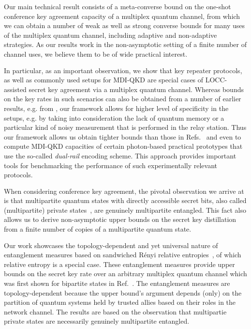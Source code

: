 \documentclass[aps,pra,twocolumn,superscriptaddress,longbibliography]{revtex4-1}
\begin{document}
Our main technical result consists of a meta-converse bound on the one-shot conference key agreement capacity of a multiplex quantum channel, from which we can obtain a number of weak as well as strong converse bounds for many uses of the multiplex quantum channel, including adaptive and non-adaptive strategies. As our results work in the non-asymptotic setting of a finite number of channel uses, we believe them to be of wide practical interest.


In particular, as an important observation, we show that key repeater protocols, as well as commonly used setups for MDI-QKD are special cases of LOCC-assisted secret key agreement via a multiplex quantum channel. Whereas bounds on the key rates in such scenarios can also be obtained from a number of earlier results, e.g. from \cite{pirandola2019capacities,AML16,CM17}, our framework allows for higher level of specificity in the setups, e.g. by taking into consideration the lack of quantum memory or a particular kind of noisy measurement that is performed in the relay station. Thus our framework allows us obtain tighter bounds than those in Refs.~\cite{pirandola2019capacities,AML16,CM17} and even to compute MDI-QKD capacities of certain photon-based practical prototypes that use the so-called \textit{dual-rail} encoding scheme. This approach provides important tools for benchmarking the performance of such experimentally relevant protocols.

When considering conference key agreement, the pivotal observation we arrive at is that multipartite quantum states with directly accessible secret bits, also called (multipartite) private states~\cite{HHHO09,AH09}, are genuinely multipartite entangled. This fact also allows us to derive non-asymptotic upper bounds on the secret key distillation from a finite number of copies of a multipartite quantum state. 


Our work showcases the topology-dependent and yet universal nature of entanglement measures based on sandwiched R\'enyi relative entropies~\cite{WWY14,MDSFT13}, of which relative entropy is a special case. These entanglement measures provide upper bounds on the secret key rate over an arbitrary multiplex quantum channel which was first shown for bipartite states in Ref.~\cite{HHHO05}. The entanglement measures are topology-dependent because the upper bound's argument depends (only) on the partition of quantum systems held by trusted allies based on their roles in the network channel. The results are based on the observation that multipartie private states are necessarily genuinely multipartite entangled. 
\end{document}
